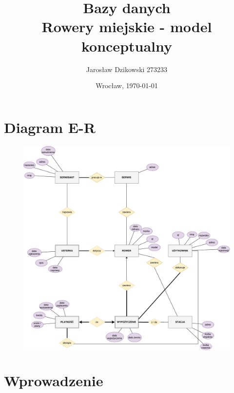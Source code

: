 \documentclass{article}
\author{Jarosław Dzikowski 273233}
\date{Wrocław, \today}
\title{\textbf{Bazy danych} \\ Rowery miejskie - model konceptualny}
\begin{document}
\maketitle

\section{Diagram E-R}
\begin{figure}[p]
\centerline{	\includegraphics[width=\paperwidth, height=\paperheight, keepaspectratio]{diagram.pdf}}
\end{figure}
\section{Wprowadzenie}
\end{document}
